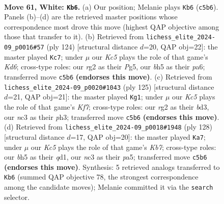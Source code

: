 \documentclass[11pt]{article}
\begin{document}
\clearpage

\begin{figure}[p]\centering
\begin{subfigure}{0.46\textwidth}\centering
\resizebox{\linewidth}{!}{%
\newchessgame
\chessboard[
  setfen={8/7p/4k3/2K1p2b/rp6/2n5/6r1/8 w - - 12 61},
  showmover=false,
  pgfstyle=straightmove, color=movearrow, markmove={c5-b6}
]}
\caption{}
\end{subfigure}\hfill
\begin{subfigure}{0.46\textwidth}\centering
\resizebox{\linewidth}{!}{%
\newchessgame
\chessboard[
  setfen={8/1p6/p2K2k1/n1p3P1/2r5/8/8/8 w - - 0 63},
  showmover=false,
  pgfstyle=straightmove, color=movearrow, markmove={d6-c7}
]}
\caption{}
\end{subfigure}
\\[4pt]
\begin{subfigure}{0.46\textwidth}\centering
\resizebox{\linewidth}{!}{%
\newchessgame
\chessboard[
  setfen={8/8/2K5/p7/6R1/3B3P/5kP1/8 b - - 2 63},
  showmover=false,
  pgfstyle=straightmove, color=movearrow, markmove={f2-g1}
]}
\caption{}
\end{subfigure}\hfill
\begin{subfigure}{0.46\textwidth}\centering
\resizebox{\linewidth}{!}{%
\newchessgame
\chessboard[
  setfen={8/1K2k3/1p2np2/p7/8/8/8/2rq4 w - - 0 65},
  showmover=false,
  pgfstyle=straightmove, color=movearrow, markmove={b7-a7}
]}
\caption{}
\end{subfigure}
\caption{\textbf{Move 61, White: \texttt{Kb6}.} (a) Our position; Melanie plays \texttt{Kb6} (\texttt{c5b6}). Panels (b)--(d) are the retrieved master positions whose correspondence most drove this move (highest QAP objective among those that transfer to it). (b) Retrieved from \texttt{lichess\_elite\_2024-09\_p0016\#57} (ply 124) [structural distance $d$=20, QAP obj=22]: the master played \texttt{Kc7}; under $\mu$ our \emph{Kc5} plays the role of that game's \emph{Kd6}; cross-type roles: our \emph{r}g2 as their \emph{P}g5, our \emph{b}h5 as their \emph{p}a6; transferred move \texttt{c5b6} \textbf{(endorses this move)}. (c) Retrieved from \texttt{lichess\_elite\_2024-09\_p0020\#1043} (ply 125) [structural distance $d$=21, QAP obj=21]: the master played \texttt{Kg1}; under $\mu$ our \emph{Kc5} plays the role of that game's \emph{Kf7}; cross-type roles: our \emph{r}g2 as their \emph{b}d3, our \emph{n}c3 as their \emph{p}h3; transferred move \texttt{c5b6} \textbf{(endorses this move)}. (d) Retrieved from \texttt{lichess\_elite\_2024-09\_p0018\#1948} (ply 128) [structural distance $d$=17, QAP obj=20]: the master played \texttt{Ka7}; under $\mu$ our \emph{Kc5} plays the role of that game's \emph{Kb7}; cross-type roles: our \emph{b}h5 as their \emph{q}d1, our \emph{n}c3 as their \emph{p}a5; transferred move \texttt{c5b6} \textbf{(endorses this move)}. Synthesis: 5 retrieved analogs transferred to \texttt{Kb6} (summed QAP objective 78, the strongest correspondence among the candidate moves); Melanie committed it via the \texttt{search} selector.}
\label{fig:thought-m120}
\end{figure}
\end{document}
